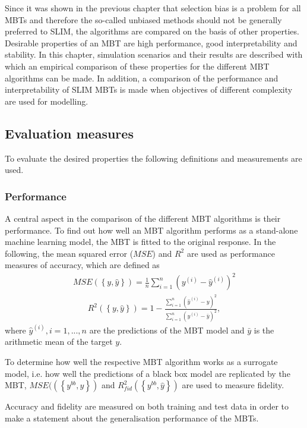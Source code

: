 Since it was shown in the previous chapter that selection bias is a problem for all MBTs and therefore the so-called unbiased methods should not be generally preferred to SLIM, the algorithms are compared on the basis of other properties.
Desirable properties of an MBT are high performance, good interpretability and stability.
In this chapter, simulation scenarios and their results are described with which an empirical comparison of these properties for the different MBT algorithms can be made.
In addition, a comparison of the performance and interpretability of SLIM MBTs is made when objectives of different complexity are used for modelling.

\subsection{Evaluation measures}
To evaluate the desired properties the following definitions and measurements are used.

\subsubsection{Performance}
A central aspect in the comparison of the different MBT algorithms is their performance. 
To find out how well an MBT algorithm performs as a stand-alone machine learning model, the MBT is fitted to the original response. 
In the following, the mean squared error ($MSE$) and $R^2$ are used as performance measures of accuracy, which are defined as
\begin{align}
    MSE \left( \left\{y, \hat{y}\right\}\right) = \frac{1}{n}\sum_{i = 1}^{n}\left(y^{(i)}-\hat{y}^{(i)}\right)^2
\end{align}
\begin{align}
    R^2\left( \left\{y, \hat{y}\right\}\right) = 1-\frac{\sum_{i = 1}^{n}\left(\hat{y}^{(i) } - y\right)^2}{\sum_{i = 1}^{n}\left(y^{(i)} - \bar{y}\right)^2},
\end{align}
where $\hat{y}^{(i)}, i = 1,...,n$ are the predictions of the MBT model and $\bar{y}$ is the arithmetic mean of the target $y$.

To determine how well the respective MBT algorithm works as a surrogate model, i.e. how well the predictions of a black box model are replicated by the MBT, $MSE(\left( \left\{y^{bb}, \hat{y}\right\}\right)$ and $R^2_{fid}\left( \left\{y^{bb}, \hat{y}\right\}\right)$ are used to measure fidelity. 

Accuracy and fidelity are measured on both training and test data in order to make a statement about the generalisation performance of the MBTs.

